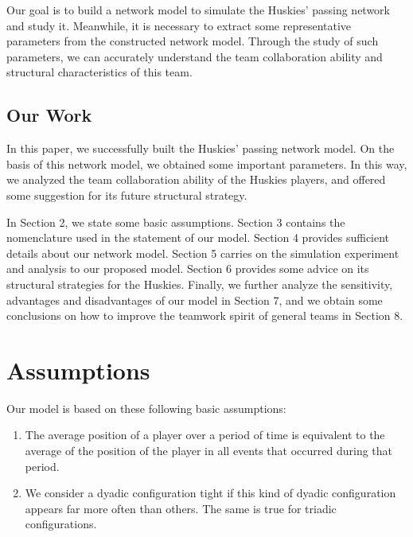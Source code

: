 \documentclass{mcmthesis}
\begin{document}
	Our goal is to build a network model to simulate the Huskies' passing network and study it.  Meanwhile, it is necessary to extract some representative parameters from the constructed network model.  Through the study of such parameters, we can accurately understand the team collaboration ability and structural characteristics of this team.
\subsection{Our Work}
	In this paper, we successfully built the Huskies' passing network model.  On the basis of this network model, we obtained some important parameters. In this way, we analyzed the team collaboration ability of the Huskies players, and offered some suggestion for its future structural strategy.

	In Section 2, we state some basic assumptions.  Section 3 contains the nomenclature used in the statement of our model.  Section 4 provides sufficient details about our network model.  Section 5 carries on the simulation experiment and analysis to our proposed model.  Section 6 provides some advice on its structural strategies for the Huskies.  Finally, we further analyze the sensitivity, advantages and disadvantages of our model in Section 7, and we obtain some conclusions on how to improve the teamwork spirit of general teams in Section 8.
\section{Assumptions}
	Our model is based on these following basic assumptions:
	\begin{enumerate}
		\item The average position of a player over a period of time is equivalent to the average of the position of the player in all events that occurred during that period.
		\item We consider a dyadic configuration tight if this kind of dyadic configuration appears far more often than others.  The same is true for triadic configurations.
	\end{enumerate}
\end{document}
